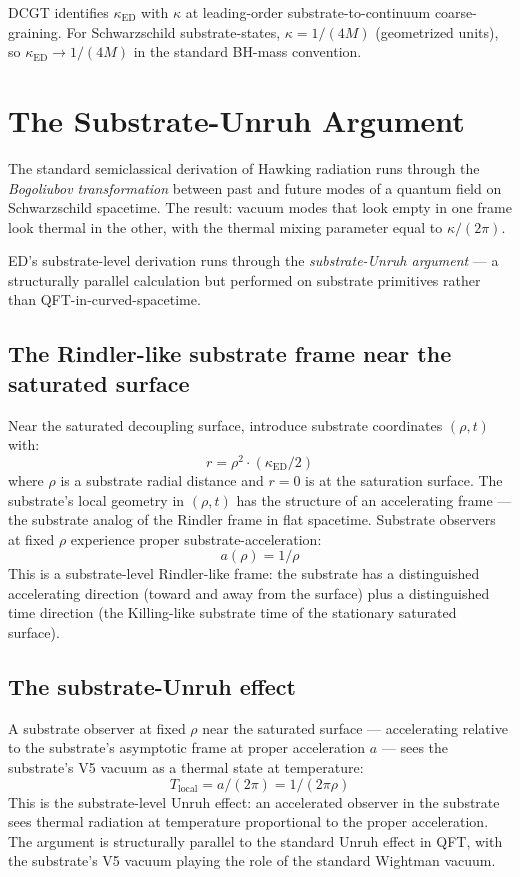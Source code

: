 \documentclass[11pt,a4paper]{article}
\begin{document}
DCGT identifies $\kappa_{\mathrm{ED}}$ with $\kappa$ at leading-order substrate-to-continuum coarse-graining. For Schwarzschild substrate-states, $\kappa = 1/(4M)$ (geometrized units), so $\kappa_{\mathrm{ED}} \to 1/(4M)$ in the standard BH-mass convention.

\section{The Substrate-Unruh Argument}

The standard semiclassical derivation of Hawking radiation runs through the \emph{Bogoliubov transformation} between past and future modes of a quantum field on Schwarzschild spacetime. The result: vacuum modes that look empty in one frame look thermal in the other, with the thermal mixing parameter equal to $\kappa/(2\pi)$.

ED's substrate-level derivation runs through the \emph{substrate-Unruh argument} --- a structurally parallel calculation but performed on substrate primitives rather than QFT-in-curved-spacetime.

\subsection{The Rindler-like substrate frame near the saturated surface}

Near the saturated decoupling surface, introduce substrate coordinates $(\rho, t)$ with:
\[
r = \rho^{2} \cdot (\kappa_{\mathrm{ED}}/2)
\]
where $\rho$ is a substrate radial distance and $r = 0$ is at the saturation surface. The substrate's local geometry in $(\rho, t)$ has the structure of an accelerating frame --- the substrate analog of the Rindler frame in flat spacetime. Substrate observers at fixed $\rho$ experience proper substrate-acceleration:
\[
a(\rho) = 1/\rho
\]
This is a substrate-level Rindler-like frame: the substrate has a distinguished accelerating direction (toward and away from the surface) plus a distinguished time direction (the Killing-like substrate time of the stationary saturated surface).

\subsection{The substrate-Unruh effect}

A substrate observer at fixed $\rho$ near the saturated surface --- accelerating relative to the substrate's asymptotic frame at proper acceleration $a$ --- sees the substrate's V5 vacuum as a thermal state at temperature:
\[
T_{\mathrm{local}} = a/(2\pi) = 1/(2\pi\rho)
\]
This is the substrate-level Unruh effect: an accelerated observer in the substrate sees thermal radiation at temperature proportional to the proper acceleration. The argument is structurally parallel to the standard Unruh effect in QFT, with the substrate's V5 vacuum playing the role of the standard Wightman vacuum.
\end{document}
